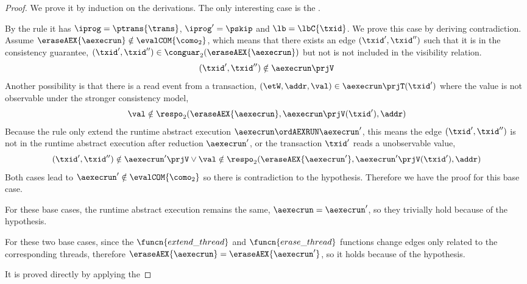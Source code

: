 \begin{proof}
We prove it by induction on the derivations.
The only interesting case is the .


By the rule it has \( \iprog = \ptrans{\trans} \), \( \iprog' = \pskip \) and \( \lb = \lbC{\txid} \).
We prove this case by deriving contradiction.
Assume \( \eraseAEX{\aexecrun} \notin \evalCOM{\como_{2}} \), which means that there exists an edge \( (\txid', \txid'') \) such that it is in the consistency guarantee, \( (\txid', \txid'') \in \conguar_{2}(\eraseAEX{\aexecrun}) \) but not is not included in the visibility relation.
\begin{equation}
    \label{equ:not-in-vis}
    (\txid', \txid'') \notin \aexecrun\prjV 
\end{equation}
Another possibility is that there is a read event from a transaction, \( (\etW, \addr, \val) \in \aexecrun\prjT(\txid') \) where the value is not observable under the stronger consistency model, \ie
\begin{equation}
    \label{equ:not-observable}
    \val \notin \respo_{2}(\eraseAEX{\aexecrun}, \aexecrun\prjV(\txid'), \addr) 
\end{equation}
Because the rule only extend the runtime abstract execution \( \aexecrun \ordAEXRUN \aexecrun'\), this means the edge \( (\txid', \txid'') \) is not in the runtime abstract execution after reduction \( \aexecrun'\), or the transaction \( \txid' \) reads a unobservable value, 
\[
    (\txid', \txid'') \notin \aexecrun'\prjV \lor \val \notin \respo_{2}(\eraseAEX{\aexecrun'}, \aexecrun'\prjV(\txid'), \addr) 
\]
Both cases lead to \( \aexecrun' \notin \evalCOM{\como_{2}} \) so there is contradiction to the hypothesis.
Therefore we have the proof for this base case.


For these base cases, the runtime abstract execution remains the same, \ie \( \aexecrun = \aexecrun' \), so they trivially hold because of the hypothesis.


For these two base cases, since the \( \funcn{extend\_thread} \)  and \( \funcn{erase\_thread} \) functions change edges only related to the corresponding threads, therefore \ie \( \eraseAEX{\aexecrun} = \eraseAEX{\aexecrun'} \), so it holds because of the hypothesis.


It is proved directly by applying the \ih
\end{proof}

